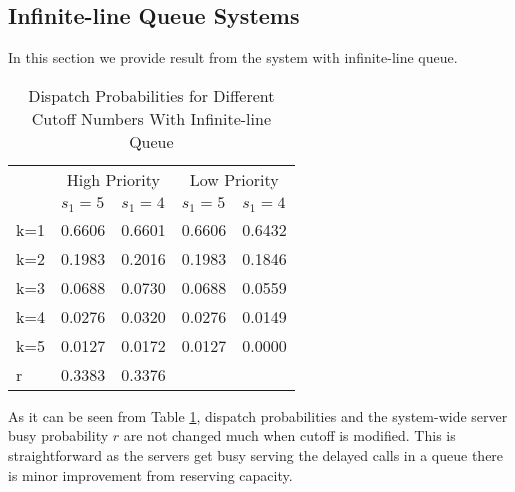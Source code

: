 \documentclass{article}
\begin{document}
 

\subsection{Infinite-line Queue Systems}

In this section we provide result from the system with infinite-line queue. 

\begin{table}
\centering
\begin{tabular}{| l | l l | l l |}
\hline
	& \multicolumn{2}{|c|}{High Priority} & \multicolumn{2}{|c|}{Low Priority}\\
    & $s_1=5$ & $s_1=4$ & $s_1=5$ & $s_1=4$ \\ 
\hline
k=1 & 0.6606 & 0.6601 & 0.6606 & 0.6432\\
k=2 & 0.1983 & 0.2016 & 0.1983 & 0.1846 \\
k=3 & 0.0688 & 0.0730 & 0.0688 & 0.0559 \\
k=4 & 0.0276 & 0.0320 & 0.0276 & 0.0149 \\
k=5 & 0.0127 & 0.0172 & 0.0127 & 0.0000\\
\hline
r   & 0.3383 & 0.3376 & &\\
\hline
\end{tabular}
\caption{Dispatch Probabilities for Different Cutoff Numbers With Infinite-line Queue}
\label{table:infty}
\end{table}

As it can be seen from Table \ref{table:infty}, dispatch probabilities and the system-wide server busy probability $r$ are not changed much when cutoff is modified. This is straightforward as the servers get busy serving the delayed calls in a queue there is minor improvement from reserving capacity.

\end{document}

